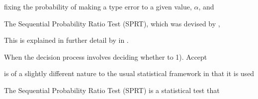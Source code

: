 fixing the probability of making a type  error to a given value, $\alpha$, and 

The Sequential Probability Ratio Test (SPRT), which was devised by \citeauthor{Wald1945SequentialHypotheses}, 


This is explained in further detail by \citeauthor{Wald1945SequentialHypotheses} in \cite{Wald1945SequentialHypotheses}. 


When the decision process involves deciding whether to 1). Accept 

is of a slightly different nature to the usual statistical framework in that it is used 

The Sequential Probability Ratio Test (SPRT) is a statistical test that 